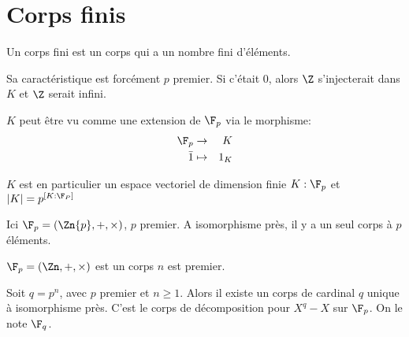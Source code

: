 
\section{Corps finis}

Un corps fini est un corps qui a un nombre fini d'éléments.

Sa caractéristique est forcément $p$ premier.
Si c'était 0, alors $\Z$ s'injecterait dans $K$ et $\Z$ serait infini.

$K$ peut être vu comme une extension de $\F_p$ via le morphisme:
\begin{eqnarray*}
	\F_p & \to & K \\
	\bar{1} &\mapsto& 1_K
\end{eqnarray*}

$K$ est en particulier un espace vectoriel de dimension finie ${K:\F_p}$ et $|K| = p ^{[K:\F_P]} $


Ici $\F_p = \left( \Zn{p}, +, \times \right)$, $p$ premier.
A isomorphisme près, il y a un seul corps à $p$ éléments.

$\F_p = \left( \Zn, +, \times \right)$ est un corps \ssi $n$ est premier.

\begin{theorem}
	Soit $q = p^n$, avec $p$ premier et $n \geq 1$. Alors il existe un corps de cardinal $q$ unique à isomorphisme près.
	C'est le corps de décomposition pour $X^q-X$ sur $\F_p$. On le note $\F_q$.
\end{theorem}

